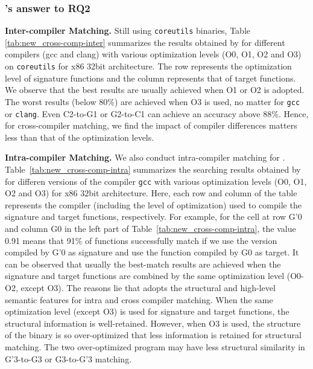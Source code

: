 \subsubsection{\toolNew's answer to RQ2}

\textbf{Inter-compiler Matching.} Still using \texttt{coreutils} binaries, Table \ref{tab:new_cross-comp-inter} summarizes the results obtained by \toolNew for different compilers (gcc and clang) with various optimization levels (O0, O1, O2 and O3) on  \texttt{coreutils} for x86 32bit architecture. The row represents the optimization level of signature functions and the column represents that of target functions. We observe that the best results are usually achieved when O1 or O2 is adopted. The worst results (below 80\%) are achieved when O3 is used, no matter for \texttt{gcc} or \texttt{clang}. Even C2-to-G1 or G2-to-C1 can achieve an accuracy above 88\%. Hence, for cross-compiler matching, we find the impact of compiler differences matters less than that of the optimization levels.

\vspace{2mm}
\noindent{}

\vspace{2mm}

\textbf{Intra-compiler Matching.} We also conduct intra-compiler matching for \toolNew. Table~\ref{tab:new_cross-comp-intra} summarizes the searching results obtained by \toolNew for differen versions of the compiler \texttt{gcc} with various optimization levels (O0, O1, O2 and O3) for x86 32bit architecture. Here, each row and column of the table represents the compiler (including the level of optimization) used to compile the signature and target functions, respectively. For example, for the cell at row G'0 and column G0 in the left part of Table~\ref{tab:new_cross-comp-intra}, the value 0.91 means that 91\% of functions successfully match if we use the version compiled by G'0 as signature and use the function compiled  by G0 as target. It can be observed that usually the best-match results are achieved when the signature and target functions are combined by the same optimization level (O0-O2, except O3). The reasons lie that \toolNew adopts the structural and high-level semantic features for intra and cross compiler matching. When the same optimization level (except O3) is used for signature and target functions, the structural information is well-retained. However, when O3 is used, the structure of the binary is so over-optimized that less information is retained for structural matching. The two over-optimized program may have less structural similarity in G'3-to-G3 or G3-to-G'3 matching.

